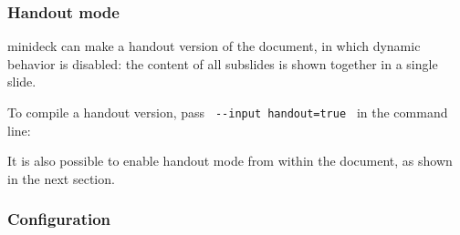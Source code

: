 \begin{Shaded}
\begin{Highlighting}[]

\NormalTok{\#slide[}





\NormalTok{  \})}



\NormalTok{]}
\end{Highlighting}
\end{Shaded}

\subsubsection{Handout mode}\label{handout-mode}

minideck can make a handout version of the document, in which dynamic
behavior is disabled: the content of all subslides is shown together in
a single slide.

To compile a handout version, pass \texttt{\ -\/-input\ handout=true\ }
in the command line:

\begin{Shaded}
\begin{Highlighting}[]
\end{Highlighting}
\end{Shaded}

It is also possible to enable handout mode from within the document, as
shown in the next section.

\subsubsection{Configuration}\label{configuration}

